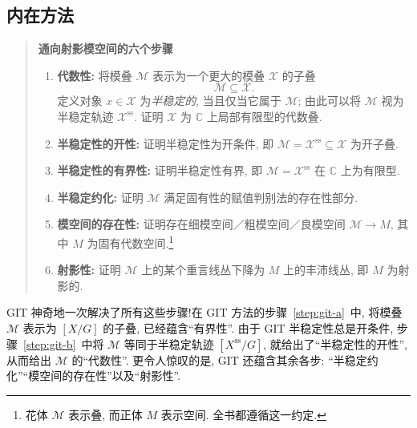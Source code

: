 \subsection{内在方法}\label{src:1.7.2-subsection}
\begin{quote}
\begin{center}\textbf{通向射影模空间的六个步骤}\end{center}
\begin{enumerate}[(1)]
\item\label{step:intrinsic-1}\textbf{代数性: }将模叠 $\mathcal M$ 表示为一个更大的模叠 $\mathcal X$ 的子叠
\[
\mathcal M\subseteq\mathcal X.
\]
定义对象 $x\in\mathcal X$ 为\textit{半稳定的}, 当且仅当它属于 $\mathcal M$; 由此可以将 $\mathcal M$ 视为半稳定轨迹 $\mathcal X^{\mathrm{ss}}$. 证明 $\mathcal X$ 为 $\mathbb C$ 上局部有限型的代数叠.
\item\label{step:intrinsic-2}\textbf{半稳定性的开性: }证明半稳定性为开条件, 即 $\mathcal M=\mathcal X^{\mathrm{ss}}\subseteq\mathcal X$ 为开子叠.
\item\label{step:intrinsic-3}\textbf{半稳定性的有界性: }证明半稳定性有界, 即 $\mathcal M=\mathcal X^{\mathrm{ss}}$ 在 $\mathbb C$ 上为有限型.
\item\label{step:intrinsic-4}\textbf{半稳定约化: }证明 $\mathcal M$ 满足固有性的赋值判别法的存在性部分.
\item\label{step:intrinsic-5}\textbf{模空间的存在性: }证明存在细模空间／粗模空间／良模空间 $\mathcal M\to M$, 其中 $M$ 为固有代数空间.\footnote{花体 $\mathcal M$ 表示叠, 而正体 $M$ 表示空间. 全书都遵循这一约定.}
\item\label{step:intrinsic-6}\textbf{射影性: }证明 $\mathcal M$ 上的某个重言线丛下降为 $M$ 上的丰沛线丛, 即 $M$ 为射影的.
\end{enumerate}
\end{quote}
GIT 神奇地一次解决了所有这些步骤!在 GIT 方法的步骤~\ref{step:git-a}~中, 将模叠 $\mathcal M$ 表示为 $[X/G]$ 的子叠, 已经蕴含``有界性''. 由于 GIT 半稳定性总是开条件, 步骤~\ref{step:git-b}~中将 $\mathcal M$ 等同于半稳定轨迹 $[X^{\mathrm{ss}}/G]$, 就给出了``半稳定性的开性'', 从而给出 $\mathcal M$ 的``代数性''. 更令人惊叹的是, GIT 还蕴含其余各步: ``半稳定约化''``模空间的存在性''以及``射影性''.

